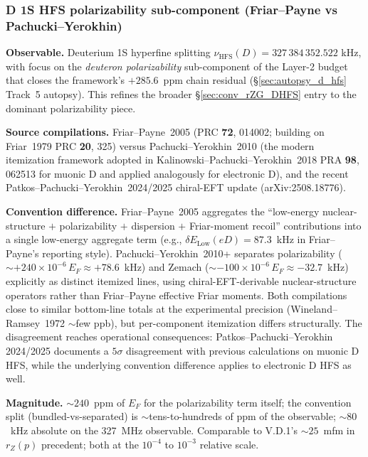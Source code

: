 \documentclass[11pt]{article}
\begin{document}
\subsubsection{D 1S HFS polarizability sub-component (Friar--Payne vs Pachucki--Yerokhin)}
\label{sec:conv_d_polarizability}

\textbf{Observable.}  Deuterium 1S hyperfine splitting
$\nu_\text{HFS}(D) = 327\,384\,352.522$ kHz, with focus on the
\emph{deuteron polarizability} sub-component of the Layer-2 budget
that closes the framework's $+285.6$~ppm chain residual
(\S\ref{sec:autopsy_d_hfs} Track~5 autopsy).  This refines the broader
\S\ref{sec:conv_rZG_DHFS} entry to the dominant polarizability piece.

\textbf{Source compilations.}  Friar--Payne~2005 (PRC \textbf{72},
014002; building on Friar~1979 PRC \textbf{20}, 325) versus
Pachucki--Yerokhin~2010 (the modern itemization framework adopted in
Kalinowski--Pachucki--Yerokhin~2018 PRA \textbf{98}, 062513 for
muonic D and applied analogously for electronic D), and the recent
Patkos--Pachucki--Yerokhin~2024/2025 chiral-EFT update
(arXiv:2508.18776).

\textbf{Convention difference.}  Friar--Payne~2005 aggregates the
``low-energy nuclear-structure $+$ polarizability $+$ dispersion $+$
Friar-moment recoil'' contributions into a single low-energy
aggregate term (e.g., $\delta E_\text{Low}(eD) = 87.3$~kHz in
Friar--Payne's reporting style).  Pachucki--Yerokhin~2010+ separates
polarizability ($\sim +240 \times 10^{-6}\,E_F \approx +78.6$~kHz)
and Zemach ($\sim -100 \times 10^{-6}\,E_F \approx -32.7$~kHz)
explicitly as distinct itemized lines, using chiral-EFT-derivable
nuclear-structure operators rather than Friar--Payne effective
Friar moments.  Both compilations close to similar bottom-line
totals at the experimental precision (Wineland--Ramsey~1972 $\sim$few
ppb), but per-component itemization differs structurally.  The
disagreement reaches operational consequences: Patkos--Pachucki--Yerokhin
2024/2025 documents a $5\sigma$ disagreement with previous
calculations on muonic D HFS, while the underlying convention
difference applies to electronic D HFS as well.

\textbf{Magnitude.}  $\sim 240$~ppm of $E_F$ for the polarizability
term itself; the convention split (bundled-vs-separated) is
$\sim$tens-to-hundreds of ppm of the observable; $\sim 80$~kHz
absolute on the 327~MHz observable.  Comparable to V.D.1's
$\sim 25$~mfm in $r_Z(p)$ precedent; both at the $10^{-4}$ to
$10^{-3}$ relative scale.
\end{document}
